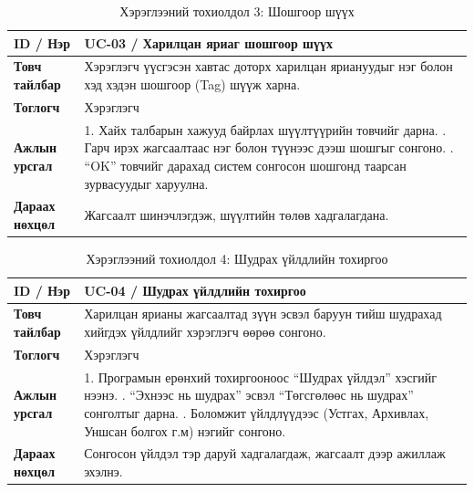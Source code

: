 \vspace{1em}

\begin{longtable}{|l|p{10.5cm}|}
    \caption{Хэрэглээний тохиолдол 3: Шошгоор шүүх} \label{tab:uc_filter_category} \\
    \hline
    \textbf{ID / Нэр} & UC-03 / Харилцан яриаг шошгоор шүүх \\ \hline
    \textbf{Товч тайлбар} & Хэрэглэгч үүсгэсэн хавтас доторх харилцан яриануудыг нэг болон хэд хэдэн шошгоор (Tag) шүүж харна. \\ \hline
    \textbf{Тоглогч} & Хэрэглэгч \\ \hline
    \textbf{Ажлын урсгал} &
    1. Хайх талбарын хажууд байрлах шүүлтүүрийн товчийг дарна. \newline
    2. Гарч ирэх жагсаалтаас нэг болон түүнээс дээш шошгыг сонгоно. \newline
    3. ``OK'' товчийг дарахад систем сонгосон шошгонд таарсан зурвасуудыг харуулна. \\ \hline
    \textbf{Дараах нөхцөл} & Жагсаалт шинэчлэгдэж, шүүлтийн төлөв хадгалагдана. \\ \hline
\end{longtable}

\vspace{1em}

\begin{longtable}{|l|p{10.5cm}|}
    \caption{Хэрэглээний тохиолдол 4: Шудрах үйлдлийн тохиргоо} \label{tab:uc_swipe_actions} \\
    \hline
    \textbf{ID / Нэр} & UC-04 / Шудрах үйлдлийн тохиргоо \\ \hline
    \textbf{Товч тайлбар} & Харилцан ярианы жагсаалтад зүүн эсвэл баруун тийш шудрахад хийгдэх үйлдлийг хэрэглэгч өөрөө сонгоно. \\ \hline
    \textbf{Тоглогч} & Хэрэглэгч \\ \hline
    \textbf{Ажлын урсгал} &
    1. Програмын ерөнхий тохиргооноос ``Шудрах үйлдэл'' хэсгийг нээнэ. \newline
    2. ``Эхнээс нь шудрах'' эсвэл ``Төгсгөлөөс нь шудрах'' сонголтыг дарна. \newline
    3. Боломжит үйлдлүүдээс (Устгах, Архивлах, Уншсан болгох г.м) нэгийг сонгоно. \\ \hline
    \textbf{Дараах нөхцөл} & Сонгосон үйлдэл тэр даруй хадгалагдаж, жагсаалт дээр ажиллаж эхэлнэ. \\ \hline
\end{longtable}

